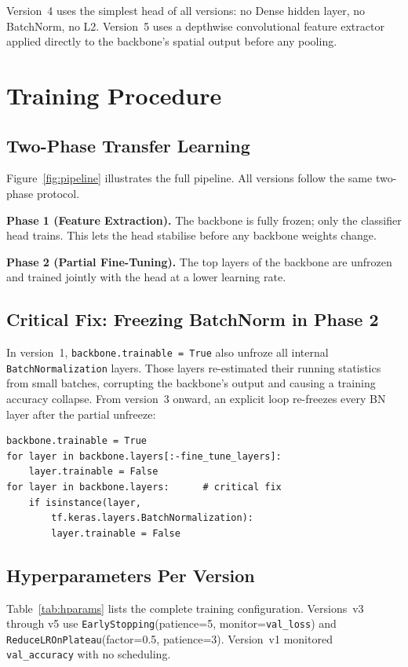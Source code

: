 \documentclass[conference]{IEEEtran}
\begin{document}
Version~4 uses the simplest head of all versions: no Dense hidden
layer, no BatchNorm, no L2. Version~5 uses a depthwise convolutional
feature extractor applied directly to the backbone's spatial output
before any pooling.

\section{Training Procedure}

\subsection{Two-Phase Transfer Learning}
Figure~\ref{fig:pipeline} illustrates the full pipeline. All versions
follow the same two-phase protocol.

\textbf{Phase 1 (Feature Extraction).} The backbone is fully frozen;
only the classifier head trains. This lets the head stabilise before
any backbone weights change.

\textbf{Phase 2 (Partial Fine-Tuning).} The top layers of the backbone
are unfrozen and trained jointly with the head at a lower learning rate.

\subsection{Critical Fix: Freezing BatchNorm in Phase 2}
In version~1, \texttt{backbone.trainable = True} also unfroze all
internal \texttt{BatchNormalization} layers. Those layers re-estimated
their running statistics from small batches, corrupting the backbone's
output and causing a training accuracy collapse. From version~3 onward,
an explicit loop re-freezes every BN layer after the partial unfreeze:

\begin{lstlisting}[style=python]
backbone.trainable = True
for layer in backbone.layers[:-fine_tune_layers]:
    layer.trainable = False
for layer in backbone.layers:      # critical fix
    if isinstance(layer,
        tf.keras.layers.BatchNormalization):
        layer.trainable = False
\end{lstlisting}

\subsection{Hyperparameters Per Version}
Table~\ref{tab:hparams} lists the complete training configuration.
Versions~v3 through v5 use \texttt{EarlyStopping}(patience=5,
monitor=\texttt{val\_loss}) and \texttt{ReduceLROnPlateau}(factor=0.5,
patience=3). Version~v1 monitored \texttt{val\_accuracy} with no
scheduling.
\end{document}
